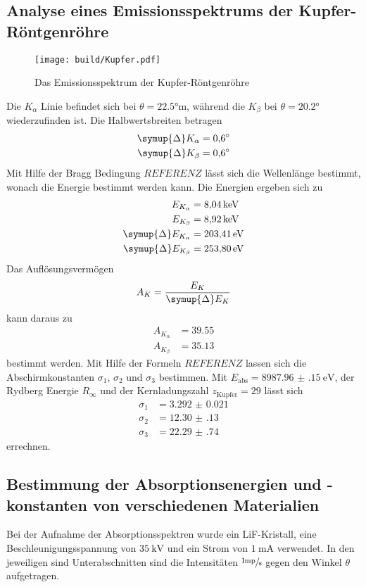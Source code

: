 \subsection{Analyse eines Emissionsspektrums der Kupfer-Röntgenröhre}
\begin{figure}
    \centering
    \caption{Das Emissionsspektrum der Kupfer-Röntgenröhre}
    \label{fig:Kupfer}
    \texttt{[image: build/Kupfer.pdf]}
\end{figure}
Die $K_\alpha$ Linie befindet sich bei  $\theta = \ang{22.5;;}$m, während die $K_\beta$ bei  $\theta = \ang{20.2;;}$ wiederzufinden ist.
Die Halbwertsbreiten betragen
\begin{align*}
    \symup{\Delta}K_\alpha  &= \ang{0.6;;} \\
    \symup{\Delta}K_\beta   &= \ang{0.6;;}
\end{align*}
Mit Hilfe der Bragg Bedingung $REFERENZ$ lässt sich die Wellenlänge bestimmt, wonach die Energie bestimmt werden kann.
Die Energien ergeben sich zu 
\begin{align*}
    E_{K_\alpha} & =  \SI{8.04}{\kilo\electronvolt} \\
    E_{K_\beta}  & =  \SI{8.92}{\kilo\electronvolt} \\
    \symup{\Delta}E_{K_\alpha} &= \SI{203.41}{\electronvolt} \\
    \symup{\Delta}E_{K_\beta}  &= \SI{253.80}{\electronvolt}
\end{align*}
Das Auflösungsvermögen 
\begin{equation}
    A_K = \frac{E_K}{\symup{\Delta}E_K}
\end{equation}
kann daraus zu 
\begin{align*}
    A_{K_\alpha}&= \num{39.55} \\
    A_{K_\beta} &= \num{35.13}
\end{align*}
bestimmt werden.
Mit Hilfe der Formeln $REFERENZ$ lassen sich die Abschirmkonstanten $\sigma_1$, $\sigma_2$ und $\sigma_3$ bestimmen.
Mit $E_\text{abs} = \SI{8987.96(15)}{\electronvolt}$, der Rydberg Energie $R_\infty$ und der Kernladungszahl
$z_\text{Kupfer} = 29 $ lässt sich
\begin{align*}
    \sigma_1 &= \num{3.292(21)}    \\
    \sigma_2 &= \num{12.30(13)}  \\
    \sigma_3 &= \num{22.29(74)}
\end{align*}
errechnen.
\subsection{Bestimmung der Absorptionsenergien und -konstanten von verschiedenen Materialien}
Bei der Aufnahme der Absorptionsspektren wurde ein LiF-Kristall, eine Beschleunigungsspannung von $\SI{35}{\kilo\volt}$ und ein Strom von $\SI{1}{\milli\ampere}$
verwendet. 
In den jeweiligen sind Unterabschnitten sind die Intensitäten $\sfrac{\text{Imp}}{\si{\second}}$ gegen den Winkel $\theta$ aufgetragen.
